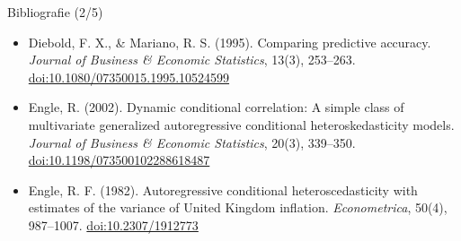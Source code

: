 \begin{frame}{Bibliografie (2/5)}
\begin{itemize}
    \item Diebold, F. X., \& Mariano, R. S. (1995). Comparing predictive accuracy. \textit{Journal of Business \& Economic Statistics}, 13(3), 253--263. \href{https://doi.org/10.1080/07350015.1995.10524599}{doi:10.1080/07350015.1995.10524599}
    \item Engle, R. (2002). Dynamic conditional correlation: A simple class of multivariate generalized autoregressive conditional heteroskedasticity models. \textit{Journal of Business \& Economic Statistics}, 20(3), 339--350. \href{https://doi.org/10.1198/073500102288618487}{doi:10.1198/073500102288618487}
    \item Engle, R. F. (1982). Autoregressive conditional heteroscedasticity with estimates of the variance of United Kingdom inflation. \textit{Econometrica}, 50(4), 987--1007. \href{https://doi.org/10.2307/1912773}{doi:10.2307/1912773}
\end{itemize}
\end{frame}

